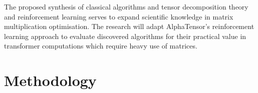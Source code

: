 \documentclass{article}
\begin{document}
The proposed synthesis of classical algorithms and tensor decomposition theory and reinforcement learning serves to expand scientific knowledge in matrix multiplication optimisation. The research will adapt AlphaTensor's reinforcement learning approach to evaluate discovered algorithms for their practical value in transformer computations which require heavy use of matrices.

\section{Methodology}
\end{document}
